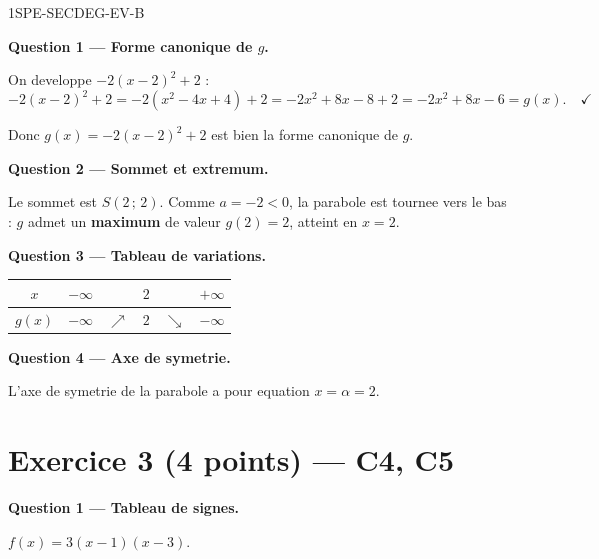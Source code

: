 \begin{corrige}{1SPE-SECDEG-EV-B}

\bigskip
\textbf{Question 1 — Forme canonique de $g$.}


On developpe $-2(x-2)^2 + 2$ :
\[
-2(x-2)^2 + 2 = -2(x^2 - 4x + 4) + 2 = -2x^2 + 8x - 8 + 2 = -2x^2 + 8x - 6 = g(x). \quad \checkmark
\]

Donc $g(x) = -2(x-2)^2 + 2$ est bien la forme canonique de $g$.

\medskip
\textbf{Question 2 — Sommet et extremum.}


Le sommet est $S(2\,;\,2)$. Comme $a = -2 < 0$, la parabole est tournee vers le bas : $g$ admet un \textbf{maximum} de valeur $g(2) = 2$, atteint en $x = 2$.

\medskip
\textbf{Question 3 — Tableau de variations.}

\begin{center}
\begin{tabular}{|c|ccccc|}
\hline
$x$ & $-\infty$ & & $2$ & & $+\infty$ \\
\hline
$g(x)$ & $-\infty$ & $\nearrow$ & $2$ & $\searrow$ & $-\infty$ \\
\hline
\end{tabular}
\end{center}

\medskip
\textbf{Question 4 — Axe de symetrie.}

L'axe de symetrie de la parabole a pour equation $x = \alpha = 2$.

\section*{Exercice 3 \hfill (4 points) — C4, C5}


\bigskip
\textbf{Question 1 — Tableau de signes.}


$f(x) = 3(x-1)(x-3)$.


\end{corrige}
